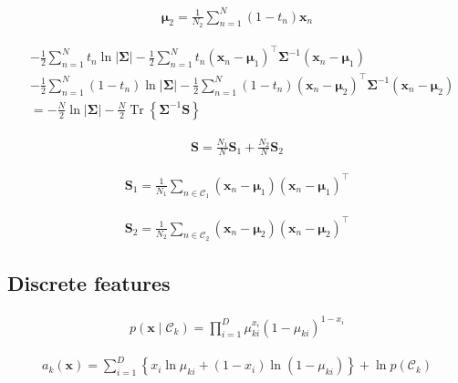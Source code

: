 \documentclass{article}
\begin{document}
\begin{align*}
\boldsymbol{\mu}_2 = \frac{1}{N_2} \sum_{n=1}^{N} \left(1 - t_n\right) \mathbf{x}_n
\tag{5.59}
\end{align*}

\begin{align*}
& -\frac{1}{2} \sum_{n=1}^{N} t_{n} \ln |\boldsymbol{\Sigma}|-\frac{1}{2} \sum_{n=1}^{N} t_{n}\left(\mathbf{x}_{n}-\boldsymbol{\mu}_{1}\right)^{\top} \boldsymbol{\Sigma}^{-1}\left(\mathbf{x}_{n}-\boldsymbol{\mu}_{1}\right) \\
& -\frac{1}{2} \sum_{n=1}^{N}\left(1-t_{n}\right) \ln |\boldsymbol{\Sigma}|-\frac{1}{2} \sum_{n=1}^{N}\left(1-t_{n}\right)\left(\mathbf{x}_{n}-\boldsymbol{\mu}_{2}\right)^{\top} \boldsymbol{\Sigma}^{-1}\left(\mathbf{x}_{n}-\boldsymbol{\mu}_{2}\right) \\
& =-\frac{N}{2} \ln |\boldsymbol{\Sigma}|-\frac{N}{2} \operatorname{Tr}\left\{\boldsymbol{\Sigma}^{-1} \mathbf{S}\right\}
\tag{5.60}
\end{align*}

\begin{align*}
\mathbf{S} = \frac{N_1}{N} \mathbf{S}_1 + \frac{N_2}{N} \mathbf{S}_2
\tag{5.61}
\end{align*}

\begin{align*}
\mathbf{S}_1 = \frac{1}{N_1} \sum_{n \in \mathcal{C}_1} \left( \mathbf{x}_n - \boldsymbol{\mu}_1 \right) \left( \mathbf{x}_n - \boldsymbol{\mu}_1 \right)^{\top}
\tag{5.62}
\end{align*}

\begin{align*}
\mathbf{S}_2 = \frac{1}{N_2} \sum_{n \in \mathcal{C}_2} \left( \mathbf{x}_n - \boldsymbol{\mu}_2 \right) \left( \mathbf{x}_n - \boldsymbol{\mu}_2 \right)^{\top}
\tag{5.63}
\end{align*}

\subsection{Discrete features}

\begin{align*}
p\left(\mathbf{x} \mid \mathcal{C}_k\right) = \prod_{i=1}^{D} \mu_{ki}^{x_i} \left(1 - \mu_{ki}\right)^{1 - x_i}
\tag{5.64}
\end{align*}

\begin{align*}
a_k(\mathbf{x}) = \sum_{i=1}^{D} \left\{ x_i \ln \mu_{ki} + \left(1 - x_i\right) \ln \left(1 - \mu_{ki}\right) \right\} + \ln p\left(\mathcal{C}_k\right)
\tag{5.65}
\end{align*}
\end{document}
